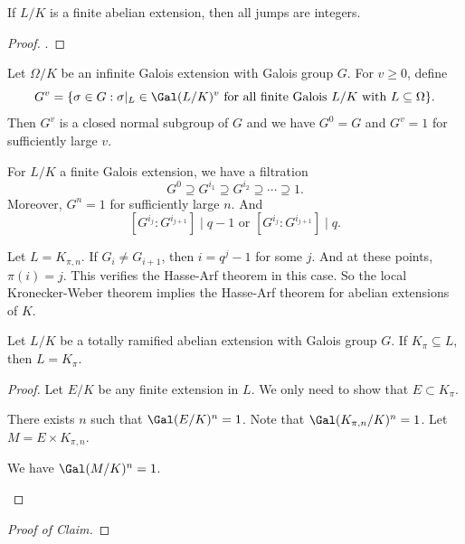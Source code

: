   \begin{theorem}
    If $L/K$ is a finite abelian extension, then all jumps are integers.
  \end{theorem}
  \begin{proof}
    .
  \end{proof}

  Let $\Omega / K$ be an infinite Galois extension with Galois group $G$.
  For $v \geq 0$, define
  \[ G^v = \{ \sigma \in G : \sigma|_{L} \in \Gal(L/K)^v \text{ for all finite Galois } L/K \text{ with } L \subseteq \Omega \}. \]
  Then $G^v$ is a closed normal subgroup of $G$ and we have $G^0 = G$ and $G^v = 1$ for sufficiently large $v$.

  For $L/K$ a finite Galois extension, we have a filtration
  \[ G^0 \supseteq G^{i_1} \supseteq G^{i_2} \supseteq \cdots \supseteq 1. \]
  Moreover, $G^n = 1$ for sufficiently large $n$.
  And 
  \[ [G^{i_j} : G^{i_{j+1}}] \mid q-1 \text{ or } [G^{i_j} : G^{i_{j+1}}] \mid q. \]

  \begin{example}
    Let $L = K_{\pi,n}$.
    If $G_i \neq G_{i+1}$, then $i = q^j - 1$ for some $j$.
    And at these points, $\pi(i) = j$.
    This verifies the Hasse-Arf theorem in this case.
    So the local Kronecker-Weber theorem implies the Hasse-Arf theorem for abelian extensions of $K$.
  \end{example}

  \begin{lemma}
    Let $L/K$ be a totally ramified abelian extension with Galois group $G$.
    If $K_\pi \subseteq L$, then $L = K_{\pi}$.
  \end{lemma}
  \begin{proof}
    Let $E/K$ be any finite extension in $L$.
    We only need to show that $E \subset K_\pi$.

    There exists $n$ such that $\Gal(E/K)^n = 1$.
    Note that $\Gal(K_{\pi,n}/K)^n = 1$.
    Let $M = E \times K_{\pi,n}$.
    \begin{claim}
      We have $\Gal(M/K)^n = 1$.
    \end{claim}

    \Yang{}
  \end{proof}

  \begin{proof}[Proof of Claim]
    \Yang{}
  \end{proof}